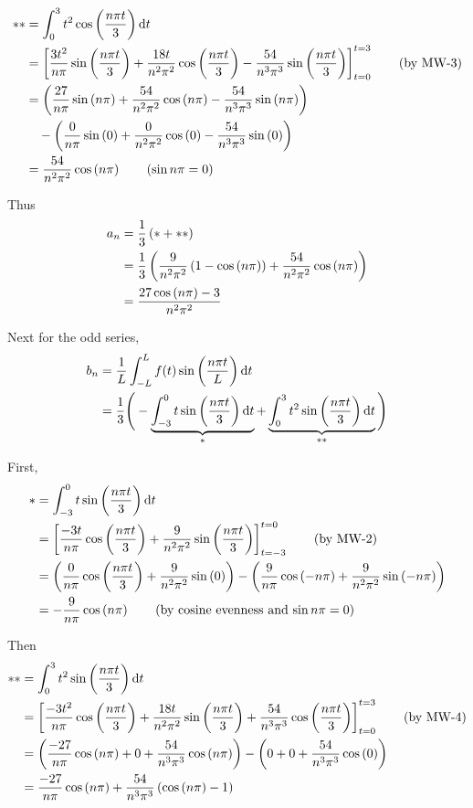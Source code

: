 \begin{align*}
    ** &=  \int_{0}^3 t^2 \cosp{\npto3} \dd t\\
    &= \brac{
        \frac{3t^2}{n \pi} \sinp{\npto3} + \frac{18t}{n^2 \pi^2} \cosp{\npto3} - \frac{54}{n^3 \pi^3} \sinp{\npto3}
    }_{t=0}^{t=3} \tag{by MW-3}\\
    &= \pars{
        \frac{27}{n \pi} \sinp{\np} + \frac{54}{n^2 \pi^2} \cosp{\np} - \frac{54}{n^3 \pi^3} \sinp{\np}
    } \\ & \quad - \pars{
        \frac{0}{n \pi} \sinp{0} + \frac{0}{n^2 \pi^2} \cosp{0} - \frac{54}{n^3 \pi^3} \sinp{0}
    } \\
    &= \frac{54}{n^2 \pi^2} \cosp{\np} \tag{$\sin{\np} = 0$}
\end{align*}

Thus 
\begin{align*}
    a_n &= \frac13 \pars{ \ast + \ast \ast}\\
    &= \frac13 \pars{
        \frac{9}{n^2 \pi^2} \pars{
            1 - \cosp{\np}
          } + \frac{54}{n^2 \pi^2} \cosp{\np}
    } \\
    &= \frac{27\cosp{\np} - 3}{n^2 \pi^2}
\end{align*}

Next for the odd series,
\begin{align*}
    b_n &= \frac{1}{L} \intll f(t) \sinp{\nptl} \dd t \\
    &= \frac13 \Bigg(
        -\underbrace{
            \int_{-3}^0 t \sinp{\npto3} \dd t
        }_{\ast}
        + \underbrace{
            \int_{0}^3 t^2 \sinp{\npto3} \dd t
        }_{\ast\ast}
    \Bigg)
\end{align*}

First, 
\begin{align*}
    \ast &= \int_{-3}^0 t \sinp{\npto3} \dd t \\
    &= \brac{ \frac{-3t}{n \pi} \cosp{\npto3} + \frac{9}{n^2 \pi^2} \sinp{\npto3}}_{t=-3}^{t=0} \tag{by MW-2}\\
    &= \pars{
        \frac{0}{n \pi} \cosp{\npto3} + \frac{9}{n^2 \pi^2} \sinp{0}
    } - \pars{
        \frac{9}{n \pi} \cosp{-\np} + \frac{9}{n^2 \pi^2} \sinp{-\np}
    } \\
    &= -\frac{9}{n \pi} \cosp{\np} \tag{by cosine evenness and $\sin \np = 0$}
\end{align*}

Then
\begin{align*}
    ** &=  \int_{0}^3 t^2 \sinp{\npto3} \dd t\\
    &= \brac{
        \onp{-3t^2} \cosp{\npto3} 
        + \onps{18t} \sinp{\npto3} + \onpc{54} \cosp{\npto3}
    }_{t=0}^{t=3} \tag{by MW-4}\\
    &= \pars{
        \onp{-27} \cosp{\np} + 0 +   \onpc{54} \cosp{\np}
    } - \pars{
        0 + 0 + \onpc{54} \cosp{0}
    } \\
    &=  \onp{-27} \cosp{\np} +  \onpc{54} \pars{ \cosp{\np} - 1}
\end{align*}

